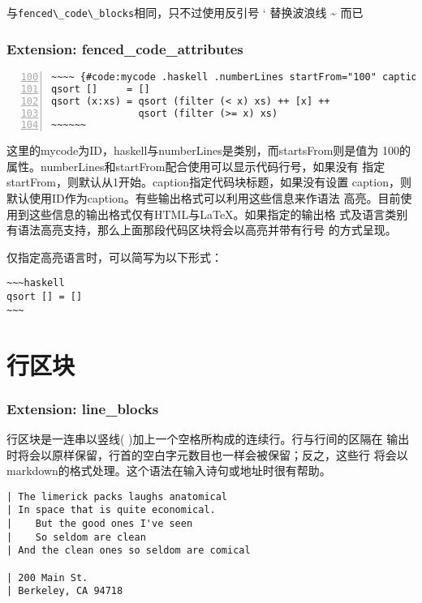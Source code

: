 \documentclass[fancyhdr,bookmark]{ctexbook}
\newcommand{\passthrough}[1]{#1}
\begin{document}
与\passthrough{\lstinline!fenced\_code\_blocks!}相同，只不过使用反引号 `
替换波浪线 \textasciitilde{} 而已

\hypertarget{extension-fenced_code_attributes}{%
\subsubsection{Extension:
fenced\_code\_attributes}\label{extension-fenced_code_attributes}}

\begin{lstlisting}[numbers=left, firstnumber=100, caption=围栏式代码块, label=code:fencedcode, float=htbp]
~~~~ {#code:mycode .haskell .numberLines startFrom="100" caption="围栏式代码块"}
qsort []     = []
qsort (x:xs) = qsort (filter (< x) xs) ++ [x] ++
               qsort (filter (>= x) xs)
~~~~~~
\end{lstlisting}

这里的mycode为ID，haskell与numberLines是类别，而startsFrom则是值为
100的属性。numberLines和startFrom配合使用可以显示代码行号，如果没有
指定startFrom，则默认从1开始。caption指定代码块标题，如果没有设置
caption，则默认使用ID作为caption。有些输出格式可以利用这些信息来作语法
高亮。目前使用到这些信息的输出格式仅有HTML与LaTeX。如果指定的输出格
式及语言类别有语法高亮支持，那么上面那段代码区块将会以高亮并带有行号
的方式呈现。

仅指定高亮语言时，可以简写为以下形式：

\begin{lstlisting}
~~~haskell
qsort [] = []
~~~
\end{lstlisting}

\hypertarget{ux884cux533aux5757}{%
\section{行区块}\label{ux884cux533aux5757}}

\hypertarget{extension-line_blocks}{%
\subsubsection{Extension: line\_blocks}\label{extension-line_blocks}}

行区块是一连串以竖线(
\textbar)加上一个空格所构成的连续行。行与行间的区隔在
输出时将会以原样保留，行首的空白字元数目也一样会被保留；反之，这些行
将会以markdown的格式处理。这个语法在输入诗句或地址时很有帮助。

\begin{lstlisting}
| The limerick packs laughs anatomical
| In space that is quite economical.
|    But the good ones I've seen
|    So seldom are clean
| And the clean ones so seldom are comical

| 200 Main St.
| Berkeley, CA 94718
\end{lstlisting}
\end{document}
